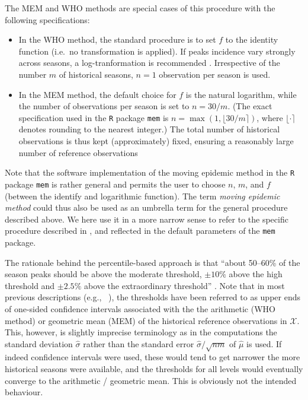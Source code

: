 \documentclass{article}
\begin{document}
\noindent The MEM and WHO methods are special cases of this procedure with the following specifications:
\begin{itemize}
\item In the WHO method, the standard procedure is to set $f$ to the identity function (i.e.\ no transformation is applied). If peaks incidence vary strongly across seasons, a log-tranformation is recommended \citep{WHO2017}. Irrespective of the number $m$ of historical seasons, $n = 1$ observation per season is used.
\item In the MEM method, the default choice for $f$ is the natural logarithm, while the number of observations per season is set to $n = 30/m$. (The exact specification used in the \texttt{R} package \texttt{mem} is $n = \max(1, \lfloor 30/m \rceil)$, where $\lfloor \cdot \rceil$ denotes rounding to the nearest integer.) The total number of historical observations is thus kept (approximately) fixed, ensuring a reasonably large number of reference observations
\end{itemize}
Note that the software implementation of the moving epidemic method in the \texttt{R} package \texttt{mem} is rather general and permits the user to choose $n$, $m$, and $f$ (between the identify and logarithmic function). The term \textit{moving epidemic method} could thus also be used as an umbrella term for the general procedure described above. We here use it in a more narrow sense to refer to the specific procedure described in \cite{Vega2015}, \cite{WHO2017} and reflected in the default parameters of the \texttt{mem} package.

The rationale behind the percentile-based approach is that ``about 50--60\% of the season peaks should be above the moderate threshold, $\pm 10\%$ above the high threshold and $\pm 2.5\%$ above the extraordinary threshold'' \citep{WHO2017}. Note that in most previous descriptions (e.g., \ \citealt{WHO2014, Vega2015}), the thresholds have been referred to as upper ends of one-sided confidence intervals associated with the the arithmetic (WHO method) or geometric mean (MEM) of the historical reference observations in $\mathcal{X}$. This, however, is slightly imprecise terminology as in the computations the standard deviation $\hat\sigma$ rather than the standard error $\hat\sigma/\sqrt{nm}$ of $\hat\mu$ is used. If indeed confidence intervals were used, these would tend to get narrower the more historical seasons were available, and the thresholds for all levels would eventually converge to the arithmetic / geometric mean. This is obviously not the intended behaviour.
\end{document}
